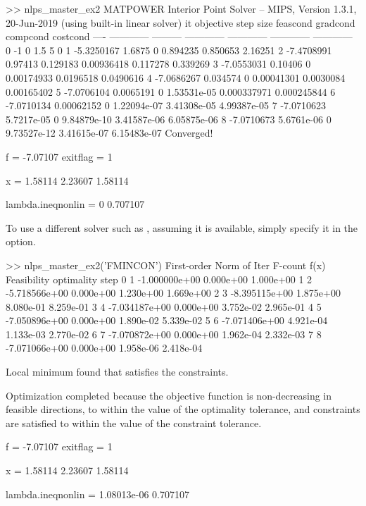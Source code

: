 \documentclass[12pt]{article}
\newcommand{\code}[1]{{\relsize{-0.5}{\tt{{#1}}}}}  %
\numberwithin{equation}{section}
\numberwithin{table}{section}
\numberwithin{figure}{section}
\begin{document}
\begin{Code}
>> nlps_master_ex2
MATPOWER Interior Point Solver -- MIPS, Version 1.3.1, 20-Jun-2019
 (using built-in linear solver)
 it    objective   step size   feascond     gradcond     compcond     costcond  
----  ------------ --------- ------------ ------------ ------------ ------------
  0            -1                       0          1.5            5            0
  1    -5.3250167     1.6875            0     0.894235     0.850653      2.16251
  2    -7.4708991    0.97413     0.129183   0.00936418     0.117278     0.339269
  3    -7.0553031    0.10406            0   0.00174933    0.0196518    0.0490616
  4    -7.0686267   0.034574            0   0.00041301    0.0030084   0.00165402
  5    -7.0706104  0.0065191            0  1.53531e-05  0.000337971  0.000245844
  6    -7.0710134 0.00062152            0  1.22094e-07  3.41308e-05  4.99387e-05
  7    -7.0710623 5.7217e-05            0  9.84879e-10  3.41587e-06  6.05875e-06
  8    -7.0710673 5.6761e-06            0  9.73527e-12  3.41615e-07  6.15483e-07
Converged!

f = -7.07107   exitflag = 1

x = 
   1.58114
   2.23607
   1.58114

lambda.ineqnonlin =
   0
   0.707107
\end{Code}
To use a different solver such as \code{fmincon}, assuming it is available, simply specify it in the \code{alg} option.
\begin{Code}
>> nlps_master_ex2('FMINCON')
                                            First-order      Norm of
 Iter F-count            f(x)  Feasibility   optimality         step
    0       1   -1.000000e+00    0.000e+00    1.000e+00
    1       2   -5.718566e+00    0.000e+00    1.230e+00    1.669e+00
    2       3   -8.395115e+00    1.875e+00    8.080e-01    8.259e-01
    3       4   -7.034187e+00    0.000e+00    3.752e-02    2.965e-01
    4       5   -7.050896e+00    0.000e+00    1.890e-02    5.339e-02
    5       6   -7.071406e+00    4.921e-04    1.133e-03    2.770e-02
    6       7   -7.070872e+00    0.000e+00    1.962e-04    2.332e-03
    7       8   -7.071066e+00    0.000e+00    1.958e-06    2.418e-04

Local minimum found that satisfies the constraints.

Optimization completed because the objective function is non-decreasing in 
feasible directions, to within the value of the optimality tolerance,
and constraints are satisfied to within the value of the constraint tolerance.


f = -7.07107   exitflag = 1

x = 
   1.58114
   2.23607
   1.58114

lambda.ineqnonlin =
   1.08013e-06
   0.707107
\end{Code}
\end{document}
